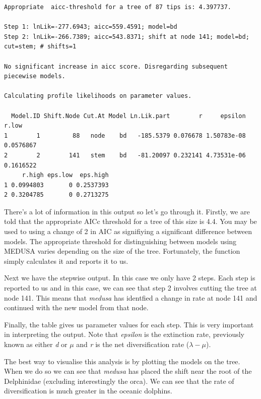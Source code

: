 \documentclass[
]{book}
\begin{document}
\begin{verbatim}
Appropriate  aicc-threshold for a tree of 87 tips is: 4.397737.

Step 1: lnLik=-277.6943; aicc=559.4591; model=bd
Step 2: lnLik=-266.7389; aicc=543.8371; shift at node 141; model=bd; cut=stem; # shifts=1

No significant increase in aicc score. Disregarding subsequent piecewise models.

Calculating profile likelihoods on parameter values.

  Model.ID Shift.Node Cut.At Model Ln.Lik.part        r     epsilon     r.low
1        1         88   node    bd   -185.5379 0.076678 1.50783e-08 0.0576867
2        2        141   stem    bd   -81.20097 0.232141 4.73531e-06 0.1616522
     r.high eps.low  eps.high
1 0.0994803       0 0.2537393
2 0.3204785       0 0.2713275
\end{verbatim}

There's a lot of information in this output so let's go through it. Firstly, we are told that the appropriate AICc threshold for a tree of this size is 4.4. You may be used to using a change of 2 in AIC as signifiying a significant difference between models. The appropriate threshold for distinguishing between models using MEDUSA varies depending on the size of the tree. Fortunately, the function simply calculates it and reports it to us.

Next we have the stepwise output. In this case we only have 2 steps. Each step is reported to us and in this case, we can see that step 2 involves cutting the tree at node 141. This means that \emph{medusa} has identfied a change in rate at node 141 and continued with the new model from that node.

Finally, the table gives us parameter values for each step. This is very important in interpreting the output. Note that \emph{epsilon} is the extinction rate, previously known as either \emph{d} or \(\mu\) and \emph{r} is the net diversification rate (\(\lambda - \mu\)).

The best way to visualise this analysis is by plotting the models on the tree. When we do so we can see that \emph{medusa} has placed the shift near the root of the Delphinidae (excluding interestingly the orca). We can see that the rate of diversification is much greater in the oceanic dolphins.
\end{document}
